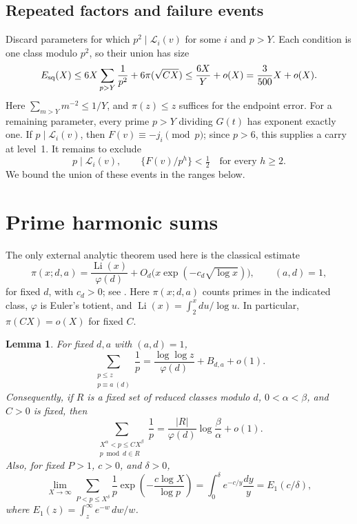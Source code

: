 \documentclass[11pt,a4paper]{article}
\newcommand{\LL}{\mathcal L}
\newcommand{\1}{\mathbf 1}
\DeclareMathOperator{\Li}{Li}
\newtheorem{lemma}[theorem]{Lemma}
\numberwithin{equation}{section}
\begin{document}
\subsection{Repeated factors and failure events}

Discard parameters for which \(p^2\mid\LL_i(v)\) for some \(i\) and
\(p>Y\). Each condition is one class modulo \(p^2\), so their union has size
\begin{equation}\label{eq:square}
 E_{\rm sq}(X)\leq6X\sum_{p>Y}\frac1{p^2}
       +6\pi(\sqrt{CX})
 \leq\frac{6X}{Y}+o(X)=\frac3{500}X+o(X).
\end{equation}
Here \(\sum_{m>Y}m^{-2}\leq1/Y\), and \(\pi(z)\leq z\) suffices for
the endpoint error. For a remaining parameter, every prime \(p>Y\)
dividing \(G(t)\) has exponent exactly one. If \(p\mid\LL_i(v)\), then
\(F(v)\equiv-j_i\pmod p\); since \(p>6\), this supplies a carry at
level~1. It remains to exclude
\begin{equation}\label{eq:bad}
 p\mid\LL_i(v),\qquad
 \{F(v)/p^h\}<\tfrac12\quad\text{for every }h\geq2.
\end{equation}
We bound the union of these events in the ranges below.

\section{Prime harmonic sums}\label{sec:primes}

The only external analytic theorem used here is the classical estimate
\begin{equation}\label{eq:pnt}
 \pi(x;d,a)=\frac{\Li(x)}{\varphi(d)}
       +O_d\bigl(x\exp(-c_d\sqrt{\log x})\bigr),
 \qquad (a,d)=1,
\end{equation}
for fixed \(d\), with \(c_d>0\); see \cite[\S27.12, (27.12.5) and
(27.12.8)]{DLMF}. Here \(\pi(x;d,a)\) counts primes in the indicated
class, \(\varphi\) is Euler's totient, and
\(\Li(x)=\int_2^x du/\log u\). In particular,
\(\pi(CX)=o(X)\) for fixed \(C\).

\begin{lemma}\label{lem:prime}
For fixed \(d,a\) with \((a,d)=1\),
\begin{equation}\label{eq:mertens}
 \sum_{\substack{p\leq z\\p\equiv a\ (d)}}\frac1p
 =\frac{\log\log z}{\varphi(d)}+B_{d,a}+o(1).
\end{equation}
Consequently, if \(R\) is a fixed set of reduced classes modulo \(d\),
\(0<\alpha<\beta\), and \(C>0\) is fixed, then
\begin{equation}\label{eq:bandprimes}
 \sum_{\substack{X^\alpha<p\leq CX^\beta\\p\bmod d\in R}}\frac1p
 =\frac{|R|}{\varphi(d)}\log\frac\beta\alpha+o(1).
\end{equation}
Also, for fixed \(P>1\), \(c>0\), and \(\delta>0\),
\begin{equation}\label{eq:weighted}
 \lim_{X\to\infty}\sum_{P<p\leq X^\delta}\frac1p
       \exp\!\left(-\frac{c\log X}{\log p}\right)
 =\int_0^\delta e^{-c/y}\frac{dy}{y}
 =E_1(c/\delta),
\end{equation}
where \(E_1(z)=\int_z^\infty e^{-w}\,dw/w\).
\end{lemma}
\end{document}
